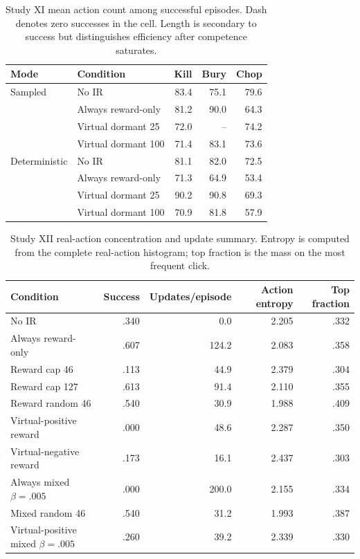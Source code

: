 \documentclass[10pt]{article}
\begin{document}
\begin{table}[H]
\centering
\small
\caption{Study XI mean action count among successful episodes. Dash denotes zero successes in the cell. Length is secondary to success but distinguishes efficiency after competence saturates.}
\begin{tabular}{llrrr}
\toprule
Mode & Condition & Kill & Bury & Chop \\
\midrule
Sampled & No IR & 83.4 & 75.1 & 79.6 \\
& Always reward-only & 81.2 & 90.0 & 64.3 \\
& Virtual dormant 25 & 72.0 & -- & 74.2 \\
& Virtual dormant 100 & 71.4 & 83.1 & 73.6 \\
\midrule
Deterministic & No IR & 81.1 & 82.0 & 72.5 \\
& Always reward-only & 71.3 & 64.9 & 53.4 \\
& Virtual dormant 25 & 90.2 & 90.8 & 69.3 \\
& Virtual dormant 100 & 70.9 & 81.8 & 57.9 \\
\bottomrule
\end{tabular}
\end{table}

\begin{table}[H]
\centering
\small
\caption{Study XII real-action concentration and update summary. Entropy is computed from the complete real-action histogram; top fraction is the mass on the most frequent click.}
\begin{tabular}{lrrrr}
\toprule
Condition & Success & Updates/episode & Action entropy & Top fraction \\
\midrule
No IR & .340 & 0.0 & 2.205 & .332 \\
Always reward-only & .607 & 124.2 & 2.083 & .358 \\
Reward cap 46 & .113 & 44.9 & 2.379 & .304 \\
Reward cap 127 & .613 & 91.4 & 2.110 & .355 \\
Reward random 46 & .540 & 30.9 & 1.988 & .409 \\
Virtual-positive reward & .000 & 48.6 & 2.287 & .350 \\
Virtual-negative reward & .173 & 16.1 & 2.437 & .303 \\
Always mixed $\beta=.005$ & .000 & 200.0 & 2.155 & .334 \\
Mixed random 46 & .540 & 31.2 & 1.993 & .387 \\
Virtual-positive mixed $\beta=.005$ & .260 & 39.2 & 2.339 & .330 \\
\bottomrule
\end{tabular}
\end{table}
\end{document}
